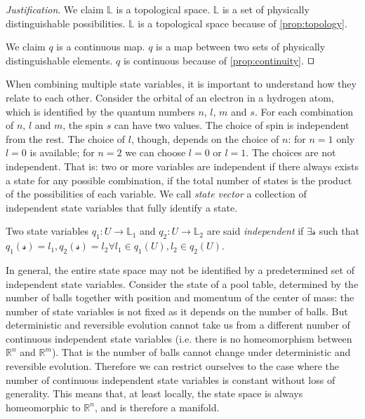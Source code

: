 \documentclass[smallextended]{svjour3}
\numberwithin{equation}{section}
\newenvironment{justification}{\emph{Justification}.}{\hfill\(\qed\)}
\begin{document}
\begin{justification}
	We claim $\mathbb{L}$ is a topological space. $\mathbb{L}$ is a set of physically distinguishable possibilities. $\mathbb{L}$ is a topological space because of \ref{prop:topology}.
	
	We claim $q$ is a continuous map. $q$ is a map between two sets of physically distinguishable elements. $q$ is continuous because of \ref{prop:continuity}.
\end{justification}

When combining multiple state variables, it is important to understand how they relate to each other. Consider the orbital of an electron in a hydrogen atom, which is identified by the quantum numbers $n$, $l$, $m$ and $s$. For each combination of $n$, $l$ and $m$, the spin $s$ can have two values. The choice of spin is independent from the rest. The choice of $l$, though, depends on the choice of $n$: for $n=1$ only $l=0$ is available; for $n=2$ we can choose $l=0$ or $l=1$. The choices are not independent. That is: two or more variables are independent if there always exists a state for any possible combination, if the total number of states is the product of the possibilities of each variable. We call \emph{state vector} a collection of independent state variables that fully identify a state.

\begin{prop}\label{prop:independent_state_variables}
	Two state variables $q_1 : U \rightarrow \mathbb{L}_1$ and $q_2 : U \rightarrow \mathbb{L}_2$ are said \emph{independent} if $\exists \mathcal{s}$ such that $q_1(\mathcal{s})=l_1, q_2(\mathcal{s})=l_2 \forall l_1 \in q_1(U), l_2 \in q_2(U)$.
\end{prop}

In general, the entire state space may not be identified by a predetermined set of independent state variables. Consider the state of a pool table, determined by the number of balls together with position and momentum of the center of mass: the number of state variables is not fixed as it depends on the number of balls. But deterministic and reversible evolution cannot take us from a different number of continuous independent state variables (i.e. there is no homeomorphism between $\mathbb{R}^n$ and $\mathbb{R}^m$). That is the number of balls cannot change under deterministic and reversible evolution. Therefore we can restrict ourselves to the case where the number of continuous independent state variables is constant without loss of generality. This means that, at least locally, the state space is always homeomorphic to $\mathbb{R}^n$, and is therefore a manifold.
\end{document}
